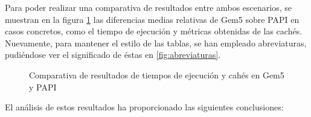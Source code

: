Para poder realizar una comparativa de resultados entre ambos escenarios, se muestran en la figura \ref{fig:diferenciaTiemposCaches} las diferencias medias relativas de Gem5 sobre PAPI en casos concretos, como el tiempo de ejecución y métricas obtenidas de las cachés. Nuevamente, para mantener el estilo de las tablas, se han empleado abreviaturas, pudiéndose ver el significado de éstas en \ref{fig:abreviaturas}.

\begin{figure}[H]
    \centering
    \caption{Comparativa de resultados de tiempos de ejecución y cahés en Gem5 y PAPI}
    \label{fig:diferenciaTiemposCaches}
\end{figure}

El análisis de estos resultados ha proporcionado las siguientes conclusiones:

